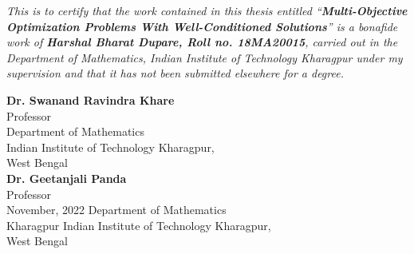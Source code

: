 % 
%  
\begin{Certificate}

\textit{This is to certify that the work contained in this thesis entitled ``\textbf{Multi-Objective Optimization Problems With Well-Conditioned Solutions}'' is a bonafide work of \textbf{Harshal Bharat Dupare, Roll no. 18MA20015}, carried out in the Department of Mathematics, Indian Institute of Technology Kharagpur under my supervision and that it has not been submitted elsewhere for a degree.}\\
\vspace*{1in}
\begin{flushright}
\textbf{Dr. Swanand Ravindra Khare}\\
Professor\\
\hfill Department of Mathematics\\
\hfill Indian Institute of Technology Kharagpur,\\
West Bengal\\
\vspace*{1in}
\textbf{Dr. Geetanjali Panda}\\
Professor\\
November, 2022 \hfill Department of Mathematics\\
Kharagpur \hfill Indian Institute of Technology Kharagpur,\\
West Bengal
\end{flushright}
\end{Certificate}

